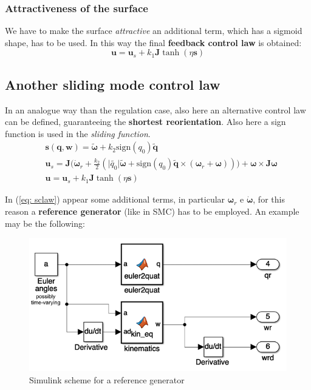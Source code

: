 \subsubsection{Attractiveness of the surface}
We have to make the surface \textit{attractive} an additional term, which has a sigmoid shape, has to be used. In this way the final \textbf{feedback control law} is obtained:
{\Large{
    \begin{equation} \label{eq: sclaw}
        \mathbf{u} = \mathbf{u}_s + k_1 \mathbf{J} \tanh(\eta\mathbf{s})
    \end{equation}
}}

\subsection{Another sliding mode control law}
In an analogue way than the regulation case, also here an alternative control law can be defined, guaranteeing the \textbf{shortest reorientation}. Also here a sign function is used in the \textit{sliding function}. 
\begin{align*}
    &\mathbf{s}(\mathbf{q}, \boldsymbol{w}) = 
    \tilde{\boldsymbol{\omega}} +
    k_2 \text{sign}(q_0) \tilde{\mathbf{q}} \\
    &\mathbf{u}_s = \mathbf{J} \biggl(
        \dot{\boldsymbol{\omega}}_r +
        \frac{k_2}{2} (\vert\tilde{q_0}\vert\tilde{\boldsymbol{\omega}}+\text{sign}(q_0)\tilde{\mathbf{q}}\times (\boldsymbol{\omega}_r+\boldsymbol{\omega}) ) \biggr)+
        \boldsymbol{\omega} \times \mathbf{J}\boldsymbol{\omega}\\
        &\mathbf{u} = \mathbf{u}_s + k_1 \mathbf{J} \tanh(\eta\mathbf{s})
\end{align*}

In (\ref{eq: sclaw}) appear some additional terms, in particular $\boldsymbol{\omega}_r$ e $\dot{\boldsymbol{\omega}}$, for this reason a \textbf{reference generator} (like in SMC) has to be employed. An example may be the following:

\begin{figure}[h]
    \centering  
    \includegraphics[scale=0.8]{AerospaceApplications/images/ref_gen.png}
    \caption{Simulink scheme for a reference generator}
\end{figure}


